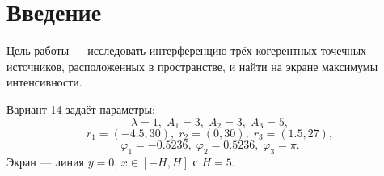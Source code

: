 \section{Введение}
Цель работы — исследовать интерференцию трёх когерентных точечных источников, 
расположенных в пространстве, и найти на экране максимумы интенсивности. 

Вариант 14 задаёт параметры:
\[
\lambda=1,\;
A_1=3,\;A_2=3,\;A_3=5,
\]
\[
r_1=(-4.5,30),\;
r_2=(0,30),\;
r_3=(1.5,27),
\]
\[
\varphi_1=-0.5236,\;
\varphi_2=0.5236,\;
\varphi_3=\pi.
\]
Экран — линия $y=0$, $x\in[-H,H]$ с $H=5$.
